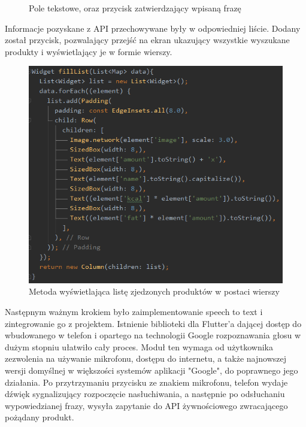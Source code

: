 \documentclass[12pt, a4paper]{article}
\begin{document}
\begin{sloppypar}
{{\begin{figure}[H]
    \caption{Pole tekstowe, oraz przycisk zatwierdzający wpisaną frazę}
    \label{fig:app2}
  \end{figure}
  Informacje pozyskane z API przechowywane były w odpowiedniej liście.
  Dodany został przycisk, pozwalający przejść na ekran ukazujący wszystkie wyszukane
  produkty i wyświetlający je w formie wierszy.
  \begin{figure}[H]
    \centering
    \includegraphics[width=.9\textwidth]{app_dev_3.PNG}
    \caption{Metoda wyświetlająca listę zjedzonych produktów w postaci wierszy}
    \label{fig:app3}
  \end{figure}
  Następnym ważnym krokiem było zaimplementowanie speech to text i zintegrowanie go z
  projektem. Istnienie biblioteki dla Flutter'a dającej dostęp do wbudowanego w
  telefon i opartego na technologii Google rozpoznawania głosu w dużym stopniu ułatwiło
  cały proces. Moduł ten wymaga od użytkownika zezwolenia na używanie mikrofonu, dostępu do
  internetu, a także najnowszej wersji domyślnej w większości systemów aplikacji "Google",
  do poprawnego jego działania. Po przytrzymaniu przycisku ze znakiem mikrofonu, telefon
  wydaje dźwięk sygnalizujący rozpoczęcie nasłuchiwania, a następnie po odsłuchaniu
  wypowiedzianej frazy, wysyła zapytanie do API żywnościowego zwracającego pożądany produkt.
  \begin{figure}[H]
    \centering

\end{figure}}}
\end{sloppypar}
\end{document}
